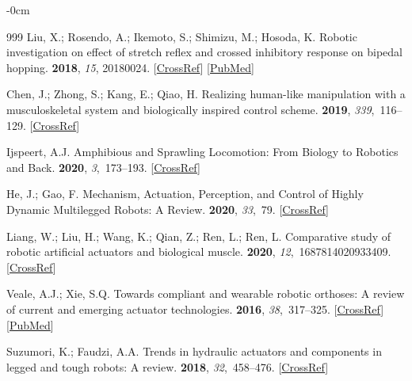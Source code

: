 \documentclass[actuators,article,accept,pdftex,moreauthors]{Definitions/mdpi}
\begin{document}
\begin{adjustwidth}{-\extralength}{0cm}
\begin{thebibliography}{999}
Liu, X.; Rosendo, A.; Ikemoto, S.; Shimizu, M.; Hosoda, K.
\newblock Robotic investigation on effect of stretch reflex and crossed
inhibitory response on bipedal hopping.
 {\bf 2018}, {\em 15}, {20180024.} 
 [\href{http://dx.doi.org/10.1098/rsif.2018.0024}{CrossRef}] [\href{http://www.ncbi.nlm.nih.gov/pubmed/29593088}{PubMed}]

Chen, J.; Zhong, S.; Kang, E.; Qiao, H.
\newblock Realizing human-like manipulation with a musculoskeletal system and
biologically inspired control scheme.
 {\bf 2019}, {\em 339},~116--129. [\href{http://dx.doi.org/10.1016/j.neucom.2018.12.069}{CrossRef}]

Ijspeert, A.J.
\newblock Amphibious and {Sprawling} {Locomotion}: {From} {Biology} to
{Robotics} and {Back}.
 {\bf
2020}, {\em 3},~173--193. [\href{http://dx.doi.org/10.1146/annurev-control-091919-095731}{CrossRef}]

He, J.; Gao, F.
\newblock Mechanism, {Actuation}, {Perception}, and {Control} of {Highly}
{Dynamic} {Multilegged} {Robots}: {A} {Review}.
 {\bf 2020}, {\em
33},~79. [\href{http://dx.doi.org/10.1186/s10033-020-00485-9}{CrossRef}]

Liang, W.; Liu, H.; Wang, K.; Qian, Z.; Ren, L.; Ren, L.
\newblock Comparative study of robotic artificial actuators and biological
muscle.
 {\bf 2020}, {\em
12},~1687814020933409. [\href{http://dx.doi.org/10.1177/1687814020933409}{CrossRef}]

Veale, A.J.; Xie, S.Q.
\newblock Towards compliant and wearable robotic orthoses: {A} review of
current and emerging actuator technologies.
 {\bf 2016}, {\em 38},~317--325. [\href{http://dx.doi.org/10.1016/j.medengphy.2016.01.010}{CrossRef}] [\href{http://www.ncbi.nlm.nih.gov/pubmed/26923385}{PubMed}]

Suzumori, K.; Faudzi, A.A.
\newblock Trends in hydraulic actuators and components in legged and tough
robots: A review.
 {\bf 2018}, {\em 32},~458--476. [\href{http://dx.doi.org/10.1080/01691864.2018.1455606}{CrossRef}]


\end{thebibliography}
\end{adjustwidth}
\end{document}
